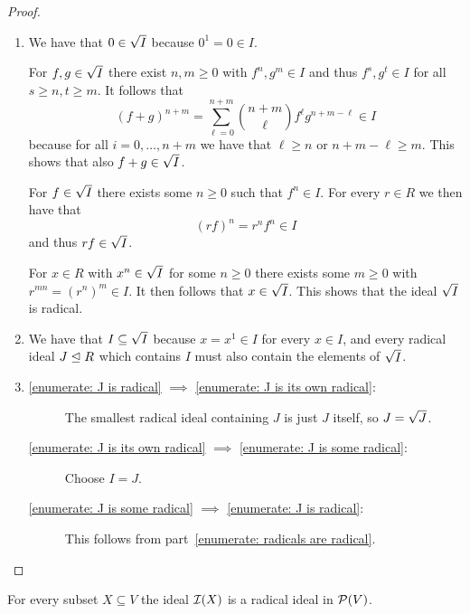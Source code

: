 \begin{proof}
    \leavevmode
  \begin{enumerate}
    \item
      We have that $0 \in \sqrt{I}$ because $0^1 = 0 \in I$.
      
      For $f, g \in \sqrt{I}$ there exist $n, m \geq 0$ with $f^n, g^m \in I$ and thus $f^s, g^t \in I$ for all $s \geq n, t \geq m$.
      It follows that
      \[
            (f + g)^{n+m}
        =   \sum_{\ell=0}^{n+m} \binom{n+m}{\ell} f^\ell g^{n+m-\ell}
        \in I
      \]
      because for all $i = 0, \dotsc, n+m$ we have that $\ell \geq n$ or $n+m-\ell \geq m$.
      This shows that also $f + g \in \sqrt{I}$.
      
      For $f \in \sqrt{I}$ there exists some $n \geq 0$ such that $f^n \in I$.
      For every $r \in R$ we then have that
      \[
            (rf)^n
        =   r^n f^n
        \in I
      \]
      and thus $rf \in \sqrt{I}$.
      
      For $x \in R$ with $x^n \in \sqrt{I}$ for some $n \geq 0$ there exists some $m \geq 0$ with $r^{mn} = (r^n)^m \in I$.
      It then follows that $x \in \sqrt{I}$.
      This shows that the ideal $\sqrt{I}$ is radical.
    \item
      We have that $I \subseteq \sqrt{I}$ because $x = x^1 \in I$ for every $x \in I$, and every radical ideal $J \trianglelefteq R$ which contains $I$ must also contain the elements of $\sqrt{I}$.
    \item
      \begin{description}
        \item[\ref*{enumerate: J is radical} $\implies$ \ref*{enumerate: J is its own radical}:]
          The smallest radical ideal containing $J$ is just $J$ itself, so $J = \sqrt{J}$.
        \item[\ref*{enumerate: J is its own radical} $\implies$ \ref*{enumerate: J is some radical}:]
          Choose $I = J$.
        \item[\ref*{enumerate: J is some radical} $\implies$ \ref*{enumerate: J is radical}:]
          This follows from part~\ref*{enumerate: radicals are radical}.
        \qedhere
      \end{description}
  \end{enumerate}
\end{proof}


\begin{lemma}
  \label{lemma: vanishing ideals are radical}
  For every subset $X \subseteq V$ the ideal $\mathcal{I}(X)$ is a radical ideal in $\mathcal{P}(V)$.
\end{lemma}


